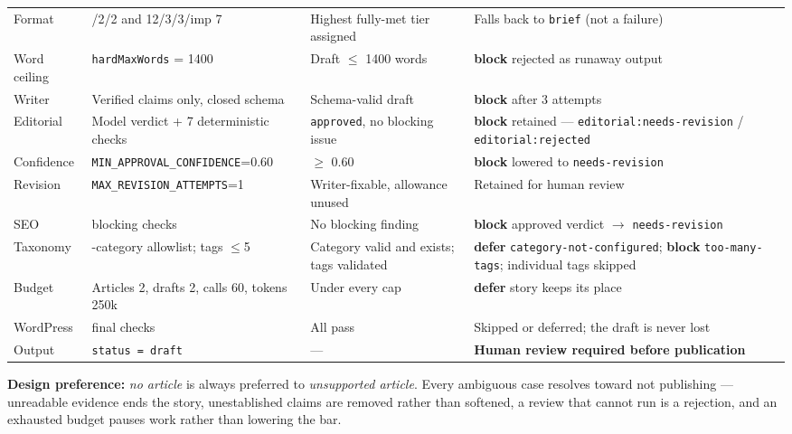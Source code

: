 \documentclass[10pt,a4paper]{article}
\newcommand{\cd}[1]{\texttt{\footnotesize\hyphenpenalty=0\exhyphenpenalty=0\relax #1}}
\newcommand{\us}{\_\discretionary{}{}{}}
\newcommand{\BL}{\textcolor{st}{\textbf{block}}}
\newcommand{\DF}{\textcolor{hd}{\textbf{defer}}}
\begin{document}
\begin{center}
\begin{tabularx}{\textwidth}{@{}>{\RaggedRight}p{2.5cm} >{\RaggedRight}p{4.4cm} >{\RaggedRight}X >{\RaggedRight}p{4.0cm}@{}}
Format & 6/2/2 and 12/3/3/imp 7 & Highest fully-met tier assigned & Falls back to \cd{brief} (not a failure) \\
Word ceiling & \cd{hardMaxWords} = 1400 & Draft $\leq$ 1400 words & \BL{} rejected as runaway output \\
Writer & Verified claims only, closed schema & Schema-valid draft & \BL{} after 3 attempts \\
Editorial & Model verdict + 7 deterministic checks & \cd{approved}, no blocking issue & \BL{} retained --- \cd{editorial:}\allowbreak\cd{needs-revision} / \cd{editorial:rejected} \\
Confidence & \cd{MIN\us APPROVAL\us CONFIDENCE}=0.60 & $\geq$ 0.60 & \BL{} lowered to \cd{needs-revision} \\
Revision & \cd{MAX\us REVISION\us ATTEMPTS}=1 & Writer-fixable, allowance unused & Retained for human review \\
SEO & 7 blocking checks & No blocking finding & \BL{} approved verdict $\rightarrow$ \cd{needs-revision} \\
Taxonomy & 10-category allowlist; tags $\leq$5 & Category valid and exists; tags validated & \DF{} \cd{category-not-configured}; \BL{} \cd{too-many-tags}; individual tags skipped \\
Budget & Articles 2, drafts 2, calls 60, tokens 250k & Under every cap & \DF{} story keeps its place \\
WordPress & 9 final checks & All pass & Skipped or deferred; the draft is never lost \\
Output & \cd{status = draft} & --- & \textbf{Human review required before publication} \\
\bottomrule
\end{tabularx}
\end{center}

\vspace{0.3em}
\begin{note}\footnotesize
\textbf{Design preference:} \emph{no article} is always preferred to \emph{unsupported article}. Every ambiguous case resolves toward not publishing --- unreadable evidence ends the story, unestablished claims are removed rather than softened, a review that cannot run is a rejection, and an exhausted budget pauses work rather than lowering the bar.
\end{note}
\end{document}
